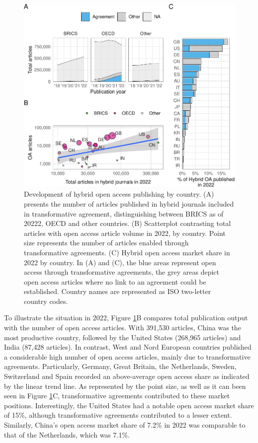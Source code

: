 \documentclass[a4paper,man,floatsintext,longtable,noextraspace,12pt]{apa6}
\begin{document}
\begin{figure}[ht!]

{\centering \includegraphics[width=0.99\linewidth,]{fig/country_patch-1} 

}

\caption{Development of hybrid open access publishing by country. (A) presents the number of articles published in hybrid journals included in transformative agreement, distinguishing between BRICS as of 20222, OECD and other countries. (B) Scatterplot contrasting total articles with open access article volume in 2022, by country. Point size represents the number of articles enabled through transformative agreements. (C) Hybrid open access market share in 2022 by country. In (A) and (C), the blue areas represent open access through transformative agreements, the grey areas depict open access articles where no link to an agreement could be established. Country names are represented as ISO two-letter country codes.}\label{fig:country_patch}
\end{figure}

To illustrate the situation in 2022, Figure \ref{fig:country_patch}B
compares total publication output with the number of open access
articles. With 391,530 articles, China was the most productive country,
followed by the United States (268,965 articles) and India (87,428
articles). In contrast, West and Nord European countries published a
considerable high number of open access articles, mainly due to
transformative agreements. Particularly, Germany, Great Britain, the
Netherlands, Sweden, Switzerland and Spain recorded an above-average
open access share as indicated by the linear trend line. As represented
by the point size, as well as it can been seen in Figure
\ref{fig:country_patch}C, transformative agreements contributed to these
market positions. Interestingly, the United States had a notable open
access market share of 15\%, although transformative agreements
contributed to a lesser extent. Similarly, China's open access market
share of 7.2\% in 2022 was comparable to that of the Netherlands, which
was 7.1\%.
\end{document}
